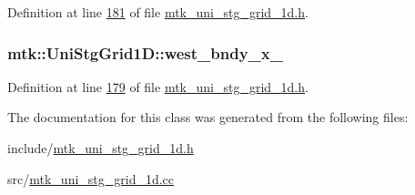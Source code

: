 Definition at line \hyperlink{mtk__uni__stg__grid__1d_8h_source_l00181}{181} of file \hyperlink{mtk__uni__stg__grid__1d_8h_source}{mtk\-\_\-uni\-\_\-stg\-\_\-grid\-\_\-1d.\-h}.

\hypertarget{classmtk_1_1UniStgGrid1D_a6910438d3396d0b9a130d11d16979c46}{
\subsubsection[{west\-\_\-bndy\-\_\-x\-\_\-}]{ mtk\-::\-Uni\-Stg\-Grid1\-D\-::west\-\_\-bndy\-\_\-x\-\_\-\hspace{0.3cm}{\ttfamily [private]}}}\label{classmtk_1_1UniStgGrid1D_a6910438d3396d0b9a130d11d16979c46}


Definition at line \hyperlink{mtk__uni__stg__grid__1d_8h_source_l00179}{179} of file \hyperlink{mtk__uni__stg__grid__1d_8h_source}{mtk\-\_\-uni\-\_\-stg\-\_\-grid\-\_\-1d.\-h}.



The documentation for this class was generated from the following files\-:\begin{DoxyCompactItemize}
\item 
include/\hyperlink{mtk__uni__stg__grid__1d_8h}{mtk\-\_\-uni\-\_\-stg\-\_\-grid\-\_\-1d.\-h}\item 
src/\hyperlink{mtk__uni__stg__grid__1d_8cc}{mtk\-\_\-uni\-\_\-stg\-\_\-grid\-\_\-1d.\-cc}\end{DoxyCompactItemize}
